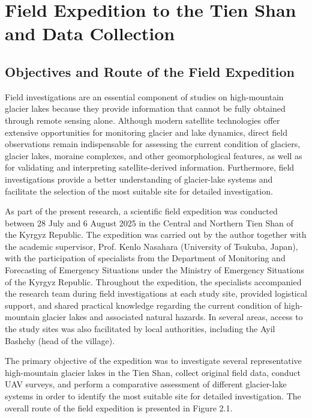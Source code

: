 \documentclass[12pt,a4paper]{report}
\begin{document}
\section{Field Expedition to the Tien Shan and Data Collection}

\subsection{Objectives and Route of the Field Expedition}

Field investigations are an essential component of studies on high-mountain glacier lakes because they provide information that cannot be fully obtained through remote sensing alone. Although modern satellite technologies offer extensive opportunities for monitoring glacier and lake dynamics, direct field observations remain indispensable for assessing the current condition of glaciers, glacier lakes, moraine complexes, and other geomorphological features, as well as for validating and interpreting satellite-derived information. Furthermore, field investigations provide a better understanding of glacier-lake systems and facilitate the selection of the most suitable site for detailed investigation. 

As part of the present research, a scientific field expedition was conducted between 28 July and 6 August 2025 in the Central and Northern Tien Shan of the Kyrgyz Republic. The expedition was carried out by the author together with the academic supervisor, Prof. Kenlo Nasahara (University of Tsukuba, Japan), with the participation of specialists from the Department of Monitoring and Forecasting of Emergency Situations under the Ministry of Emergency Situations of the Kyrgyz Republic. Throughout the expedition, the specialists accompanied the research team during field investigations at each study site, provided logistical support, and shared practical knowledge regarding the current condition of high-mountain glacier lakes and associated natural hazards. In several areas, access to the study sites was also facilitated by local authorities, including the Ayil Bashchy (head of the village). 

The primary objective of the expedition was to investigate several representative high-mountain glacier lakes in the Tien Shan, collect original field data, conduct UAV surveys, and perform a comparative assessment of different glacier-lake systems in order to identify the most suitable site for detailed investigation. The overall route of the field expedition is presented in Figure 2.1. 
\end{document}
